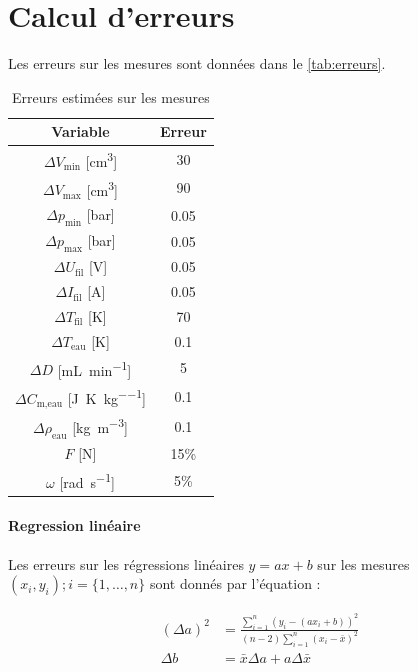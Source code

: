 \section{Calcul d'erreurs}
\label{sec:erreurs}

Les erreurs sur les mesures sont données dans le \autoref{tab:erreurs}.

\begin{table}[h]
    \centering
    \begin{tabulary}{\textwidth}{C C}
        \toprule
        Variable & Erreur \\
        \midrule
        \(\Delta V_\textrm{min}\) [\si{\centi\meter\cubed}] & 30 \\
        \(\Delta V_\textrm{max}\) [\si{\centi\meter\cubed}] & 90 \\
        \(\Delta p_\textrm{min}\) [\si{\bar}] & 0.05 \\
        \(\Delta p_\textrm{max}\) [\si{\bar}] & 0.05 \\
        \(\Delta U_\textrm{fil}\) [\si{\volt}] & 0.05 \\
        \(\Delta I_\textrm{fil}\) [\si{\ampere}] & 0.05 \\
        \(\Delta T_\textrm{fil}\) [\si{\kelvin}] & 70 \\
        \(\Delta T_\textrm{eau}\) [\si{\kelvin}] & 0.1 \\
        \(\Delta D\) [\si{\milli\liter \per \minute}] & 5 \\
        \(\Delta C_\textrm{m,eau}\) [\si{\joule\per\kelvin\per\kilo\gram}] & 0.1 \\
        \(\Delta \rho_\textrm{eau}\) [\si{\kilo\gram\per\meter\cubed}] & 0.1 \\
        \(F\) [\si{\newton}] & 15\% \\
        \(\omega\) [\si{\radian \per \second}] & 5\% \\
        \bottomrule
    \end{tabulary}
    \caption{Erreurs estimées sur les mesures}
    \label{tab:erreurs}
\end{table}

\paragraph*{Regression linéaire}
Les erreurs sur les régressions linéaires \(y = ax + b\) sur les mesures \((x_i, y_i) ; i = \{1, \hdots, n\}\) sont donnés par l'équation \cite{erreursmesure}:

\begin{equation}
    \label{eq:erreur:fit}
    \begin{aligned}
        (\Delta a)^2 &= \frac{\sum_{i=1}^{n}(y_i - (a x_i + b))^2}{(n-2) \sum_{i=1}^{n}(x_i - \bar{x})^2}\\
        \Delta b &= \bar{x} \Delta a + a \Delta \bar{x}
    \end{aligned}
\end{equation}

